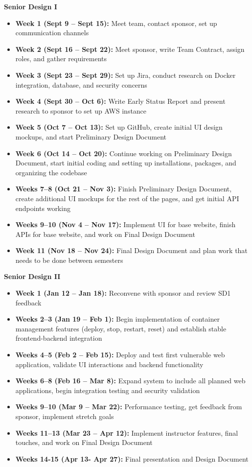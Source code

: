 \documentclass[12pt,titlepage]{article}
\begin{document}
\noindent\textbf{Senior Design I}
\begin{itemize}
    \item \textbf{Week 1 (Sept 9 – Sept 15):} Meet team, contact sponsor, set up communication channels
    \item \textbf{Week 2 (Sept 16 – Sept 22):} Meet sponsor, write Team Contract, assign roles, and gather requirements
    \item \textbf{Week 3 (Sept 23 – Sept 29):} Set up Jira, conduct research on Docker integration, database, and security concerns
    \item \textbf{Week 4 (Sept 30 – Oct 6):} Write Early Status Report and present research to sponsor to set up AWS instance
    \item \textbf{Week 5 (Oct 7 – Oct 13):} Set up GitHub, create initial UI design mockups, and start Preliminary Design Document
    \item \textbf{Week 6 (Oct 14 – Oct 20):} Continue working on Preliminary Design Document, start initial coding and setting up installations, packages, and organizing the codebase
    \item \textbf{Weeks 7–8 (Oct 21 – Nov 3):} Finish Preliminary Design Document, create additional UI mockups for the rest of the pages, and get initial API endpoints working
    \item \textbf{Weeks 9–10 (Nov 4 – Nov 17):} Implement UI for base website, finish APIs for base website, and work on Final Design Document
    \item \textbf{Week 11 (Nov 18 – Nov 24):} Final Design Document and plan work that needs to be done between semesters
\end{itemize}
\textbf{Senior Design II}
\begin{itemize}
    \item \textbf{Week 1 (Jan 12 – Jan 18):} Reconvene with sponsor and review SD1 feedback
    \item \textbf{Weeks 2–3 (Jan 19 – Feb 1):} Begin implementation of container management features (deploy, stop, restart, reset) and establish stable frontend-backend integration
    \item \textbf{Weeks 4–5 (Feb 2 – Feb 15):} Deploy and test first vulnerable web application, validate UI interactions and backend functionality
    \item \textbf{Weeks 6–8 (Feb 16 – Mar 8):} Expand system to include all planned web applications, begin integration testing and security validation
    \item \textbf{Weeks 9–10 (Mar 9 – Mar 22):} Performance testing, get feedback from sponsor, implement stretch goals
    \item \textbf{Weeks 11–13 (Mar 23 – Apr 12):} Implement instructor features, final touches, and work on Final Design Document
    \item \textbf{Weeks 14-15 (Apr 13- Apr 27):} Final presentation and Design Document
\end{itemize}
\end{document}
